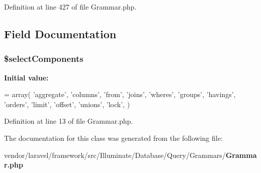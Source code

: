 Definition at line 427 of file Grammar.\+php.



\subsection{Field Documentation}
\subsubsection[{\$select\+Components}]{\setlength{\rightskip}{0pt plus 5cm}\$select\+Components\hspace{0.3cm}{\ttfamily [protected]}}\label{class_illuminate_1_1_database_1_1_query_1_1_grammars_1_1_grammar_a39380226e96f850f8c6055eee9b47282}
{\bfseries Initial value\+:}
\begin{DoxyCode}
= array(
        \textcolor{stringliteral}{'aggregate'},
        \textcolor{stringliteral}{'columns'},
        \textcolor{stringliteral}{'from'},
        \textcolor{stringliteral}{'joins'},
        \textcolor{stringliteral}{'wheres'},
        \textcolor{stringliteral}{'groups'},
        \textcolor{stringliteral}{'havings'},
        \textcolor{stringliteral}{'orders'},
        \textcolor{stringliteral}{'limit'},
        \textcolor{stringliteral}{'offset'},
        \textcolor{stringliteral}{'unions'},
        \textcolor{stringliteral}{'lock'},
    )
\end{DoxyCode}


Definition at line 13 of file Grammar.\+php.



The documentation for this class was generated from the following file\+:\begin{DoxyCompactItemize}
\item 
vendor/laravel/framework/src/\+Illuminate/\+Database/\+Query/\+Grammars/{\bf Grammar.\+php}\end{DoxyCompactItemize}
